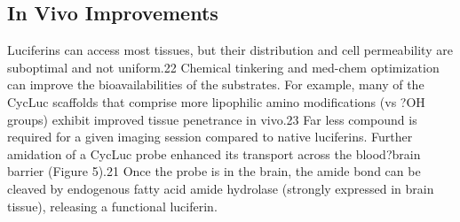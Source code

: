 \subsection*{In Vivo Improvements}
Luciferins can access most tissues, but their distribution and cell permeability are suboptimal and
not uniform.22 Chemical tinkering and med-chem optimization
can improve the bioavailabilities of the substrates. For example,
many of the CycLuc scaffolds that comprise more lipophilic
amino modifications (vs ?OH groups) exhibit improved tissue
penetrance in vivo.23 Far less compound is required for a given
imaging session compared to native luciferins. Further
amidation of a CycLuc probe enhanced its transport across
the blood?brain barrier (Figure 5).21 Once the probe is in the
brain, the amide bond can be cleaved by endogenous fatty acid
amide hydrolase (strongly expressed in brain tissue), releasing a
functional luciferin.
